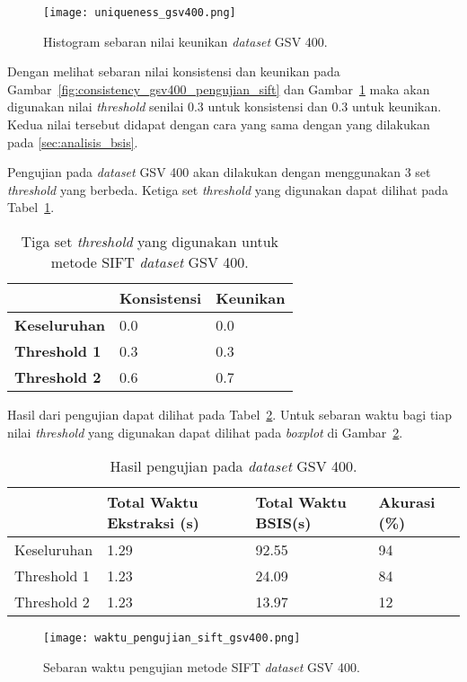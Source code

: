 \begin{figure}[H]
	\centering
	\texttt{[image: uniqueness\_gsv400.png]}
	\caption{Histogram sebaran nilai keunikan \textit{dataset} GSV 400.}
	\label{fig:uniqueness_gsv400_pengujian_sift}
\end{figure}
Dengan melihat sebaran nilai konsistensi dan keunikan pada Gambar~\ref{fig:consistency_gsv400_pengujian_sift} dan Gambar~\ref{fig:uniqueness_gsv400_pengujian_sift} maka akan digunakan nilai \textit{threshold} senilai 0.3 untuk konsistensi dan 0.3 untuk keunikan. Kedua nilai tersebut didapat dengan cara yang sama dengan yang dilakukan pada \ref{sec:analisis_bsis}. 

Pengujian pada \textit{dataset} GSV 400 akan dilakukan dengan menggunakan 3 set \textit{threshold} yang berbeda. Ketiga set \textit{threshold} yang digunakan dapat dilihat pada Tabel~\ref{tab:threshold_gsv400_sift}.
\begin{table}[H]
	\centering
	\begin{tabular}{|l|l|l|}
		\hline
		& \textbf{Konsistensi} & \textbf{Keunikan} \\ \hline
		\textbf{Keseluruhan} & 0.0                  & 0.0               \\ \hline
		\textbf{Threshold 1} & 0.3                  & 0.3               \\ \hline
		\textbf{Threshold 2} & 0.6                  & 0.7               \\ \hline
	\end{tabular}
	\caption{Tiga set \textit{threshold} yang digunakan untuk metode SIFT \textit{dataset} GSV 400.}
	\label{tab:threshold_gsv400_sift}
\end{table}
Hasil dari pengujian dapat dilihat pada Tabel~\ref{tab:pengujian_sift_gsv400}. Untuk sebaran waktu bagi tiap nilai \textit{threshold} yang digunakan dapat dilihat pada \textit{boxplot} di Gambar~\ref{fig:waktu_pengujian_sift_gsv400}.
\begin{table}[H]
	\centering
	\begin{tabular}{|l|l|l|l|}
		\hline
		& \textbf{Total Waktu Ekstraksi (s)} & \textbf{Total Waktu BSIS(s)} & \textbf{Akurasi (\%)} \\ \hline
		Keseluruhan & 1.29	&	92.55                    & 94                    \\ \hline
		Threshold 1 & 1.23	&	24.09                    & 84                    \\ \hline
		Threshold 2 & 1.23	&	13.97                    & 12                    \\ \hline
	\end{tabular}
	\caption{Hasil pengujian pada \textit{dataset} GSV 400.}
	\label{tab:pengujian_sift_gsv400}
\end{table}
\begin{figure}[H]
	\centering
	\texttt{[image: waktu\_pengujian\_sift\_gsv400.png]}
	\caption{Sebaran waktu pengujian metode SIFT \textit{dataset} GSV 400.}
	\label{fig:waktu_pengujian_sift_gsv400}
\end{figure}

